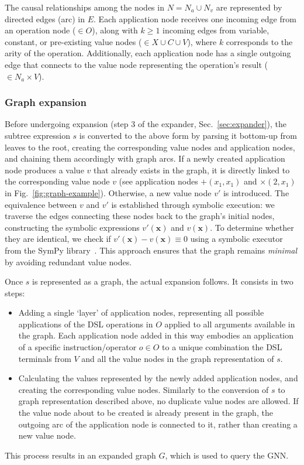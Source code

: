 The causal relationships among the nodes in $N = N_a \cup N_v$ are represented by directed edges (arc) in $E$. Each application node receives one incoming edge from an operation node ($\in O$), along with $k \geq 1$ incoming edges from variable, constant, or pre-existing value nodes ($\in X \cup C \cup V$), where $k$ corresponds to the arity of the operation. Additionally, each application node has a single outgoing edge that connects to the value node representing the operation's result ($\in N_a \times V$).

\subsubsection{Graph expansion}\label{sec:graph_expansion}

Before undergoing expansion (step 3 of the expander, Sec.\ \ref{sec:expander}), the subtree expression $s$ is converted to the above form by parsing it bottom-up from leaves to the root, creating the corresponding value nodes and application nodes, and chaining them accordingly with graph arcs.
If a newly created application node produces a value $v$ that already exists in the graph, it is directly linked to the corresponding value node $v$ (see application nodes $+(x_1, x_1)$ and $\times(2, x_1)$ in Fig.~\ref{fig:graph-example}). Otherwise, a new value node $v'$ is introduced. The equivalence between $v$ and $v'$ is established through symbolic execution: we traverse the edges connecting these nodes back to the graph's initial nodes, constructing the symbolic expressions $v'(\mathbf{x})$ and $v(\mathbf{x})$. To determine whether they are identical, we check if $v'(\mathbf{x}) - v(\mathbf{x}) \equiv 0$ using a symbolic executor from the SymPy library~\cite{10.7717/peerj-cs.103}. This approach ensures that the graph remains \emph{minimal} by avoiding redundant value nodes.

Once $s$ is represented as a graph, the actual expansion follows. It consists in two steps:
\begin{itemize}
    \item Adding a single `layer' of application nodes, representing all possible applications of the DSL operations in $O$ applied to all arguments available in the graph. Each application node added in this way embodies an application of a specific instruction/operator $o \in O$ to a unique combination the DSL terminals from $V$ and all the value nodes in the graph representation of $s$. 
    \item Calculating the values represented by the newly added application nodes, and creating the corresponding value nodes. Similarly to the conversion of $s$ to graph representation described above, no duplicate value nodes are allowed. If the value node about to be created is already present in the graph, the outgoing arc of the application node is connected to it, rather than creating a new value node. 
\end{itemize}
This process results in an expanded graph $G$, which is used to query the GNN. 







